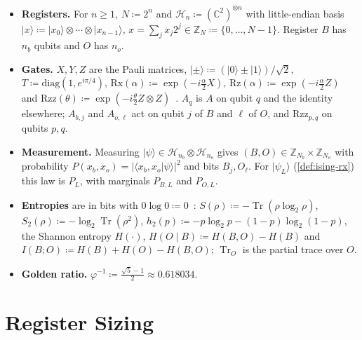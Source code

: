 \documentclass[11pt,a4paper]{article}
\theoremstyle{plain}
\theoremstyle{definition}
\theoremstyle{remark}
\newcommand{\C}{\mathbb{C}}
\newcommand{\Z}{\mathbb{Z}}
\newcommand{\Hil}{\mathcal{H}}
\newcommand{\Tr}{\operatorname{Tr}}
\newcommand{\ket}[1]{\lvert#1\rangle}
\newcommand{\braket}[2]{\langle#1\vert#2\rangle}
\begin{document}
\begin{itemize}
  \item \textbf{Registers.} For \( n \ge 1 \), \( N \coloneqq 2^n \) and
    \( \Hil_n \coloneqq {(\C^2)}^{\otimes n} \) with little-endian basis
    \( \ket{x} \coloneqq \ket{x_0} \otimes \cdots \otimes \ket{x_{n-1}} \),
    \( x = \sum_{j} x_j 2^j \in \Z_N \coloneqq \{0, \dots, N - 1\} \). Register \( B \) has
    \( n_b \) qubits and \( O \) has \( n_o \).
  \item \textbf{Gates.} \( X, Y, Z \) are the Pauli matrices,
    \( \ket{\pm} \coloneqq (\ket{0} \pm \ket{1}) / \sqrt{2} \),
    \( T \coloneqq \mathrm{diag}(1, e^{i\pi / 4}) \),
    \( \mathrm{Rx}(\alpha) \coloneqq \exp(-i\frac{\alpha}{2} X) \),
    \( \mathrm{Rz}(\alpha) \coloneqq \exp(-i\frac{\alpha}{2} Z) \) and
    \( \mathrm{Rzz}(\theta) \coloneqq \exp(-i\frac{\theta}{2} Z \otimes Z) \)~\cite{NielsenChuang}.
    \( A_q \) is \( A \) on qubit \( q \) and the identity elsewhere; \( A_{b,j} \) and
    \( A_{o,\ell} \) act on qubit \( j \) of \( B \) and \( \ell \) of \( O \), and
    \( \mathrm{Rzz}_{p,q} \) on qubits \( p, q \).
  \item \textbf{Measurement.} Measuring \( \ket{\psi} \in \Hil_{n_b} \otimes \Hil_{n_o} \) gives
    \( (B, O) \in \Z_{N_b} \times \Z_{N_o} \) with probability
    \( P(x_b, x_o) = {\lvert \braket{x_b, x_o}{\psi} \rvert}^2 \) and bits \( B_j, O_\ell \).
    For \( \ket{\psi_L} \) (\cref{def:ising-rx}) this law is \( P_L \), with marginals
    \( P_{B,L} \) and \( P_{O,L} \).
  \item \textbf{Entropies} are in bits with \( 0 \log 0 \coloneqq 0 \)~\cite{NielsenChuang}:
    \( S(\rho) \coloneqq -\Tr(\rho \log_2 \rho) \), \( S_2(\rho) \coloneqq -\log_2 \Tr(\rho^2) \),
    \( h_2(p) \coloneqq -p \log_2 p - (1 - p) \log_2(1 - p) \), the Shannon entropy
    \( H(\cdot) \), \( H(O \mid B) \coloneqq H(B, O) - H(B) \) and
    \( I(B; O) \coloneqq H(B) + H(O) - H(B, O) \); \( \Tr_O \) is the partial trace over \( O \).
  \item \textbf{Golden ratio.} \( \varphi^{-1} \coloneqq \frac{\sqrt{5} - 1}{2} \approx 0.618034 \).
\end{itemize}

\clearpage
\section{Register Sizing}\label{sec:budget}
\end{document}
